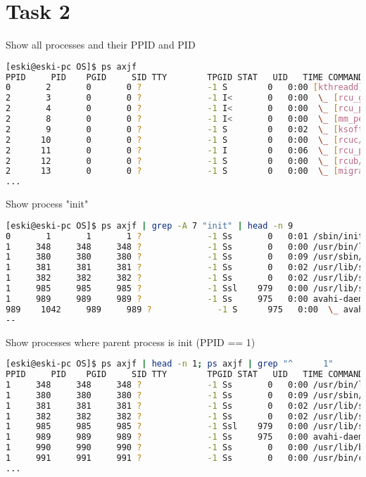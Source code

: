 \documentclass{article}
\begin{document}
\section*{Task 2}\vspace{0mm}

Show all processes and their PPID and PID
\begin{lstlisting}[language=BASH]
[eski@eski-pc OS]$ ps axjf
PPID     PID    PGID     SID TTY        TPGID STAT   UID   TIME COMMAND
0       2       0       0 ?             -1 S        0   0:00 [kthreadd]
2       3       0       0 ?             -1 I<       0   0:00  \_ [rcu_gp]
2       4       0       0 ?             -1 I<       0   0:00  \_ [rcu_par_gp]
2       8       0       0 ?             -1 I<       0   0:00  \_ [mm_percpu_wq]
2       9       0       0 ?             -1 S        0   0:02  \_ [ksoftirqd/0]
2      10       0       0 ?             -1 S        0   0:00  \_ [rcuc/0]
2      11       0       0 ?             -1 I        0   0:06  \_ [rcu_preempt]
2      12       0       0 ?             -1 S        0   0:00  \_ [rcub/0]
2      13       0       0 ?             -1 S        0   0:00  \_ [migration/0]
...
\end{lstlisting}

Show process "init"
	\begin{lstlisting}[language=BASH]
[eski@eski-pc OS]$ ps axjf | grep -A 7 "init" | head -n 9
0       1       1       1 ?             -1 Ss       0   0:01 /sbin/init
1     348     348     348 ?             -1 Ss       0   0:00 /usr/bin/lvmetad -f
1     380     380     380 ?             -1 Ss       0   0:09 /usr/sbin/haveged -w 1024 -v 1 --Foreground
1     381     381     381 ?             -1 Ss       0   0:02 /usr/lib/systemd/systemd-journald
1     382     382     382 ?             -1 Ss       0   0:02 /usr/lib/systemd/systemd-udevd
1     985     985     985 ?             -1 Ssl    979   0:00 /usr/lib/systemd/systemd-timesyncd
1     989     989     989 ?             -1 Ss     975   0:00 avahi-daemon: running [eski-pc.local]
989    1042     989     989 ?             -1 S      975   0:00  \_ avahi-daemon: chroot helper
--
\end{lstlisting}

Show processes where parent process is init (PPID == 1)
\begin{lstlisting}[language=BASH]
[eski@eski-pc OS]$ ps axjf | head -n 1; ps axjf | grep "^      1"      
PPID     PID    PGID     SID TTY        TPGID STAT   UID   TIME COMMAND
1     348     348     348 ?             -1 Ss       0   0:00 /usr/bin/lvmetad -f
1     380     380     380 ?             -1 Ss       0   0:09 /usr/sbin/haveged -w 1024 -v 1 --Foreground
1     381     381     381 ?             -1 Ss       0   0:02 /usr/lib/systemd/systemd-journald
1     382     382     382 ?             -1 Ss       0   0:02 /usr/lib/systemd/systemd-udevd
1     985     985     985 ?             -1 Ssl    979   0:00 /usr/lib/systemd/systemd-timesyncd
1     989     989     989 ?             -1 Ss     975   0:00 avahi-daemon: running [eski-pc.local]
1     990     990     990 ?             -1 Ss       0   0:00 /usr/lib/bluetooth/bluetoothd
1     991     991     991 ?             -1 Ss       0   0:00 /usr/bin/crond -n
...
	\end{lstlisting}
\end{document}
